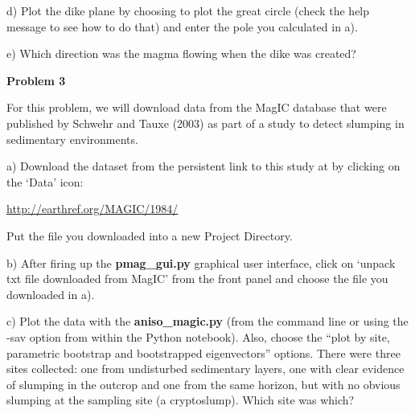 {d) Plot the dike plane by choosing to plot the great circle  (check the help message to see how to do that)  and enter the pole you calculated in a).   

e) Which direction was the magma flowing when the dike was created?  


{\bf Problem 3}

For this problem, we will download data from the MagIC database that were published by Schwehr and Tauxe (2003) as part of a study to detect slumping in sedimentary environments.   
\nocite{schwehr03}

a)  Download the  dataset from  the persistent link to this study at by clicking on the `Data' icon:

\url{http://earthref.org/MAGIC/1984/}

Put the file you downloaded into a  new Project Directory.

b)   After firing up the {\bf pmag\_gui.py} graphical user interface, click on `unpack  txt file downloaded from MagIC' from the front panel and choose the file you downloaded in a). 

c) Plot the data with the {\bf aniso\_magic.py} (from the command line or using the -sav option from within the Python notebook).  Also,  choose the  ``plot by site, parametric bootstrap and bootstrapped eigenvectors'' options.  There were three sites collected:  one from  undisturbed sedimentary layers,  one with clear evidence of slumping in the outcrop and one from the same horizon, but with no obvious slumping at the sampling site (a cryptoslump).  Which site was which?  
}
%
